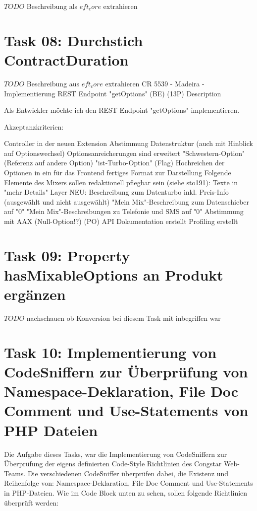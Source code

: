 \documentclass[11pt,a4paper]{article} %
\begin{document}
$TODO$ Beschreibung als $eft_core$ extrahieren




\section{Task 08: Durchstich ContractDuration}

$TODO$ Beschreibung aus $eft_core$ extrahieren
CR 5539 - Madeira - Implementierung REST Endpoint "getOptions" (BE) (13P)
Description


Als Entwickler möchte ich den REST Endpoint "getOptions" implementieren.

Akzeptanzkriterien:

Controller in der neuen Extension
Abstimmung Datenstruktur (auch mit Hinblick auf Optionswechsel)
Optionsanreicherungen sind erweitert
"Schwestern-Option" (Referenz auf andere Option)
"ist-Turbo-Option" (Flag)
Hochreichen der Optionen in ein für das Frontend fertiges Format zur Darstellung
Folgende Elemente des Mixers sollen redaktionell pflegbar sein (siehe sto191):
Texte in "mehr Details" Layer
NEU: Beschreibung zum Datenturbo inkl. Preis-Info (ausgewählt und nicht ausgewählt)
"Mein Mix"-Beschreibung zum Datenschieber auf "0"
"Mein Mix"-Beschreibungen zu Telefonie und SMS auf "0"
Abstimmung mit AAX (Null-Option!?) (PO)
API Dokumentation erstellt
Profiling erstellt




\section{Task 09: Property hasMixableOptions an Produkt ergänzen}

$TODO$ nachschauen ob Konversion bei diesem Task mit inbegriffen war




\section{Task 10: Implementierung von CodeSniffern zur Überprüfung von Namespace-Deklaration, File Doc Comment und Use-Statements von PHP Dateien}

Die Aufgabe dieses Tasks, war die Implementierung von CodeSniffern zur Überprüfung
der eigens definierten Code-Style Richtlinien des Congstar Web-Teams. Die verschiedenen CodeSniffer 
überprüfen dabei, die Existenz und Reihenfolge von: Namespace-Deklaration, 
File Doc Comment und Use-Statements in PHP-Dateien. Wie im Code Block unten zu sehen, sollen 
folgende Richtlinien überprüft werden:
\end{document}

